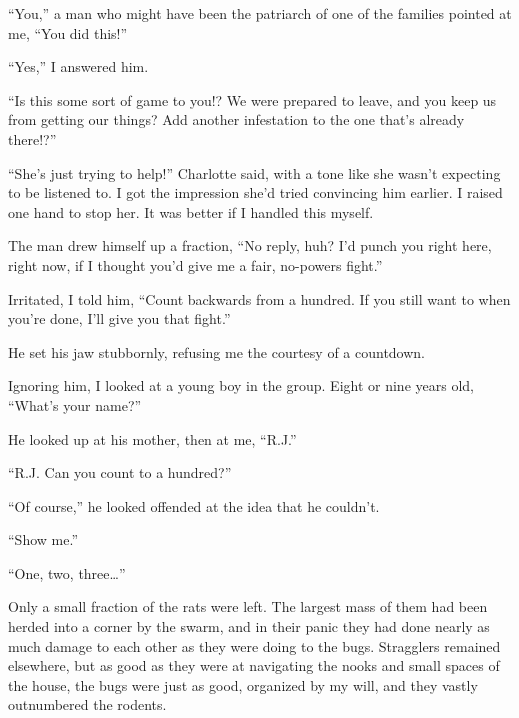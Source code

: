 ``You,'' a man who might have been the patriarch of one of the families pointed at me, ``You did this!''



``Yes,'' I answered him.



``Is this some sort of game to you!?  We were prepared to leave, and you keep us from getting our things?  Add another infestation to the one that's already there!?''



``She's just trying to help!'' Charlotte said, with a tone like she wasn't expecting to be listened to.  I got the impression she'd tried convincing him earlier.  I raised one hand to stop her.  It was better if I handled this myself.



The man drew himself up a fraction, ``No reply, huh?  I'd punch you right here, right now, if I thought you'd give me a fair, no-powers fight.''



Irritated, I told him, ``Count backwards from a hundred.  If you still want to when you're done, I'll give you that fight.''



He set his jaw stubbornly, refusing me the courtesy of a countdown.



Ignoring him, I looked at a young boy in the group.  Eight or nine years old, ``What's your name?''



He looked up at his mother, then at me, ``R.J.''



``R.J.  Can you count to a hundred?''



``Of course,'' he looked offended at the idea that he couldn't.



``Show me.''



``One, two, three\ldots''



Only a small fraction of the rats were left.  The largest mass of them had been herded into a corner by the swarm, and in their panic they had done nearly as much damage to each other as they were doing to the bugs.  Stragglers remained elsewhere, but as good as they were at navigating the nooks and small spaces of the house, the bugs were just as good, organized by my will, and they vastly outnumbered the rodents.



